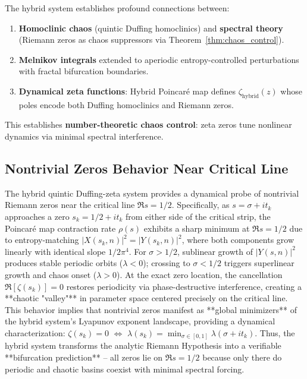 \documentclass{ws-ijbc}
\begin{document}
The hybrid system establishes profound connections between:

\begin{enumerate}
\item \textbf{Homoclinic chaos} (quintic Duffing homoclinics) and \textbf{spectral theory} (Riemann zeros as chaos suppressors via Theorem~\ref{thm:chaos_control}).
\item \textbf{Melnikov integrals} extended to aperiodic entropy-controlled perturbations with fractal bifurcation boundaries.
\item \textbf{Dynamical zeta functions}: Hybrid Poincaré map defines $\zeta_\text{hybrid}(z)$ whose poles encode both Duffing homoclinics and Riemann zeros.
\end{enumerate}

This establishes \textbf{number-theoretic chaos control}: zeta zeros tune nonlinear dynamics via minimal spectral interference.

\subsection{Nontrivial Zeros Behavior Near Critical Line}

The hybrid quintic Duffing-zeta system provides a dynamical probe of nontrivial Riemann zeros near the critical line $\Re s=1/2$. Specifically, as $s=\sigma+it_k$ approaches a zero $s_k=1/2+it_k$ from either side of the critical strip, the Poincaré map contraction rate $\rho(s)$ exhibits a sharp minimum at $\Re s=1/2$ due to entropy-matching $|X(s_k,n)|^2=|Y(s_k,n)|^2$, where both components grow linearly with identical slope $1/2\pi^4$. For $\sigma>1/2$, sublinear growth of $|Y(s,n)|^2$ produces stable periodic orbits ($\lambda<0$); crossing to $\sigma<1/2$ triggers superlinear growth and chaos onset ($\lambda>0$). At the exact zero location, the cancellation $\Re[\zeta(s_k)]=0$ restores periodicity via phase-destructive interference, creating a **chaotic "valley"** in parameter space centered precisely on the critical line. This behavior implies that nontrivial zeros manifest as **global minimizers** of the hybrid system's Lyapunov exponent landscape, providing a dynamical characterization: $\zeta(s_k)=0$ $\iff$ $\lambda(s_k)=\min_{\sigma\in[0,1]}\lambda(\sigma+it_k)$. Thus, the hybrid system transforms the analytic Riemann Hypothesis into a verifiable **bifurcation prediction** -- all zeros lie on $\Re s=1/2$ because only there do periodic and chaotic basins coexist with minimal spectral forcing.
\end{document}
